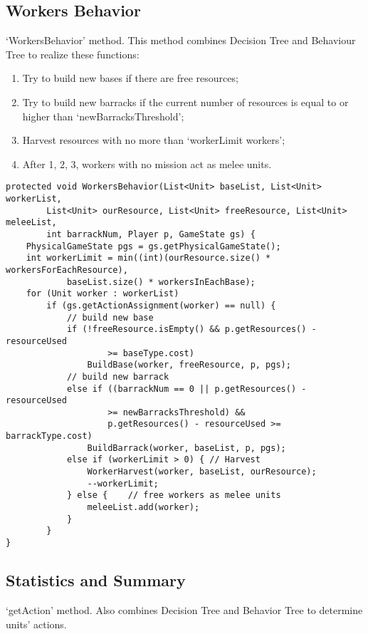 \subsection{Workers Behavior}
‘WorkersBehavior’ method. This method combines Decision Tree and Behaviour Tree to realize these functions:
\begin{enumerate}
    \item Try to build new bases if there are free resources;
    \item Try to build new barracks if the current number of resources is equal to or higher than ‘newBarracksThreshold’;
    \item Harvest resources with no more than ‘workerLimit workers’;
    \item After 1, 2, 3, workers with no mission act as melee units.
\end{enumerate}

\begin{verbatim}
protected void WorkersBehavior(List<Unit> baseList, List<Unit> workerList,
        List<Unit> ourResource, List<Unit> freeResource, List<Unit> meleeList,
        int barrackNum, Player p, GameState gs) {
    PhysicalGameState pgs = gs.getPhysicalGameState();
    int workerLimit = min((int)(ourResource.size() * workersForEachResource),
            baseList.size() * workersInEachBase);
    for (Unit worker : workerList)
        if (gs.getActionAssignment(worker) == null) {
            // build new base
            if (!freeResource.isEmpty() && p.getResources() - resourceUsed
                    >= baseType.cost)
                BuildBase(worker, freeResource, p, pgs);
            // build new barrack
            else if ((barrackNum == 0 || p.getResources() - resourceUsed
                    >= newBarracksThreshold) &&
                    p.getResources() - resourceUsed >= barrackType.cost)
                BuildBarrack(worker, baseList, p, pgs);
            else if (workerLimit > 0) { // Harvest
                WorkerHarvest(worker, baseList, ourResource);
                --workerLimit;
            } else {    // free workers as melee units
                meleeList.add(worker);
            }
        }
}
\end{verbatim}

\subsection{Statistics and Summary}
‘getAction’ method. Also combines Decision Tree and Behavior Tree to determine units’ actions.

